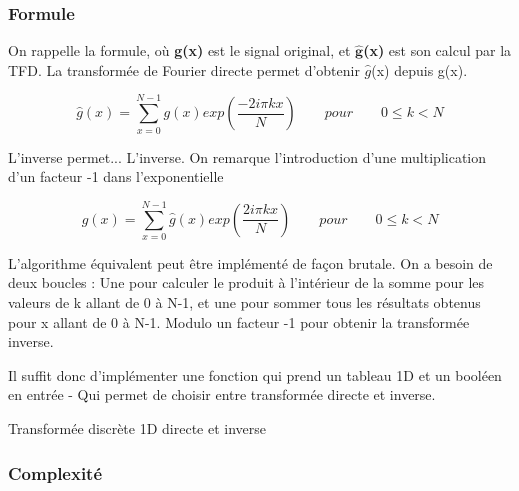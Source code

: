 \documentclass{article}
\begin{document}
\subsubsection{Formule}
On rappelle la formule, où \textbf{g(x)} est le signal original, et \textbf{$\widehat{\textbf{g}}$(x)} est son calcul par la TFD. La transformée de Fourier directe permet d'obtenir $\widehat{g}$(x) depuis g(x).

\begin{equation}
		\widehat{g}(x) = \sum_{x = 0}^{N-1}g(x) exp(\frac{-2i\pi kx}{N}) \qquad pour \qquad 0 \leq k < N
\end{equation}

\noindent L'inverse permet... L'inverse. On remarque l'introduction d'une multiplication d'un facteur -1 dans l'exponentielle

\begin{equation}
	g(x) = \sum_{x = 0}^{N-1}\widehat{g}(x) exp(\frac{2i\pi kx}{N}) \qquad pour \qquad 0 \leq k < N
\end{equation}


\noindent L'algorithme équivalent peut être implémenté de façon brutale. On a besoin de deux boucles : Une pour calculer le produit à l'intérieur de la somme pour les valeurs de k allant de 0 à N-1, et une pour sommer tous les résultats obtenus pour x allant de 0 à N-1. Modulo un facteur -1 pour obtenir la transformée inverse.

Il suffit donc d'implémenter une fonction qui prend un tableau 1D et un booléen en entrée - Qui permet de choisir entre transformée directe et inverse.

\begin{algorithm}
	\caption{Transformée discrète 1D directe et inverse}\label{alg:cap}
\end{algorithm}

\subsubsection{Complexité}
\end{document}
